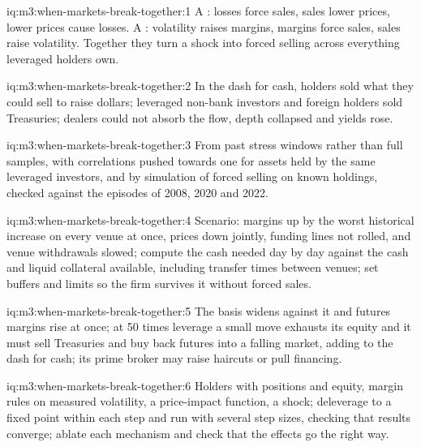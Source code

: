 \begin{solution}{iq:m3:when-markets-break-together:1}
A : losses force sales, sales lower prices, lower prices cause losses. A : volatility raises margins, margins force sales, sales raise
volatility. Together they turn a shock into forced selling across everything leveraged holders own.
\end{solution}

\begin{solution}{iq:m3:when-markets-break-together:2}
In the dash for cash, holders sold what they could sell to raise dollars; leveraged non-bank investors and foreign holders sold Treasuries; dealers could not
absorb the flow, depth collapsed and yields rose.
\end{solution}

\begin{solution}{iq:m3:when-markets-break-together:3}
From past stress windows rather than full samples, with correlations pushed towards one for assets held by the same leveraged investors, and by simulation of
forced selling on known holdings, checked against the episodes of 2008, 2020 and 2022.
\end{solution}

\begin{solution}{iq:m3:when-markets-break-together:4}
Scenario: margins up by the worst historical increase on every venue at once, prices down jointly, funding lines not rolled,   and venue
withdrawals slowed; compute the cash needed day by day against the cash and liquid collateral available, including transfer times between venues; set buffers
and limits so the firm survives it without forced sales.
\end{solution}

\begin{solution}{iq:m3:when-markets-break-together:5}
The basis widens against it and futures margins rise at once; at 50 times leverage a small move exhausts its equity and it must sell Treasuries and buy back
futures into a falling market, adding to the dash for cash; its prime broker may raise haircuts or pull financing.
\end{solution}

\begin{solution}{iq:m3:when-markets-break-together:6}
Holders with positions and equity, margin rules on measured volatility, a price-impact function, a shock; deleverage to a fixed point within each step and run
with several step sizes, checking that results converge; ablate each mechanism and check that the effects go the right way.
\end{solution}
